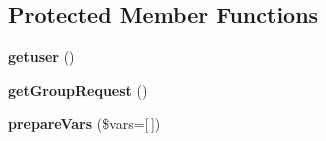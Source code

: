 \subsection*{Protected Member Functions}
\begin{DoxyCompactItemize}
\item 
\hypertarget{classDMA_1_1Friends_1_1Components_1_1GroupRequest_abf24425ad2bc88375097dd15bb35fd01}{{\bfseries getuser} ()}\label{classDMA_1_1Friends_1_1Components_1_1GroupRequest_abf24425ad2bc88375097dd15bb35fd01}

\item 
\hypertarget{classDMA_1_1Friends_1_1Components_1_1GroupRequest_a45abdc367821a9a6d105917f125057e9}{{\bfseries get\+Group\+Request} ()}\label{classDMA_1_1Friends_1_1Components_1_1GroupRequest_a45abdc367821a9a6d105917f125057e9}

\item 
\hypertarget{classDMA_1_1Friends_1_1Components_1_1GroupRequest_a8c20a7584f43b3e79ea92e77f8ba4b45}{{\bfseries prepare\+Vars} (\$vars=\mbox{[}$\,$\mbox{]})}\label{classDMA_1_1Friends_1_1Components_1_1GroupRequest_a8c20a7584f43b3e79ea92e77f8ba4b45}

\end{DoxyCompactItemize}


